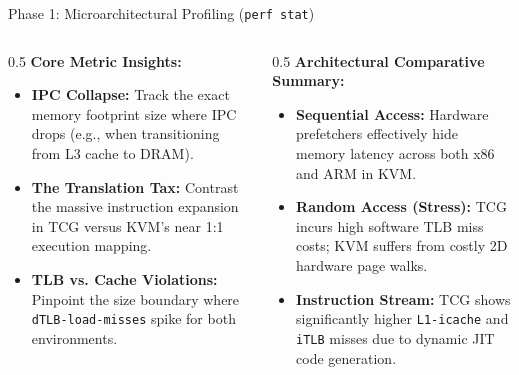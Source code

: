 \documentclass[aspectratio=169]{beamer} %
\begin{document}
  \begin{frame}{Phase 1: Microarchitectural Profiling (\texttt{perf stat})}
      \begin{columns}[T]
          \begin{column}{0.5\textwidth}
              \textbf{Core Metric Insights:}
              \begin{itemize}
                  \item \textbf{IPC Collapse:} Track the exact memory footprint size where IPC drops (e.g., when transitioning from L3 cache to DRAM).
                  \item \textbf{The Translation Tax:} Contrast the massive instruction expansion in TCG versus KVM's near 1:1 execution mapping.
                  \item \textbf{TLB vs. Cache Violations:} Pinpoint the size boundary where \texttt{dTLB-load-misses} spike for both environments.
              \end{itemize}
          \end{column}

          \begin{column}{0.5\textwidth}
              \textbf{Architectural Comparative Summary:}
              \begin{itemize}
                  \item \textbf{Sequential Access:} Hardware prefetchers effectively hide memory latency across both x86 and ARM in KVM.
                  \item \textbf{Random Access (Stress):} TCG incurs high software TLB miss costs; KVM suffers from costly 2D hardware page walks.
                  \item \textbf{Instruction Stream:} TCG shows significantly higher \texttt{L1-icache} and \texttt{iTLB} misses due to dynamic JIT code generation.
              \end{itemize}
          \end{column}
      \end{columns}
  \end{frame}
\end{document}

